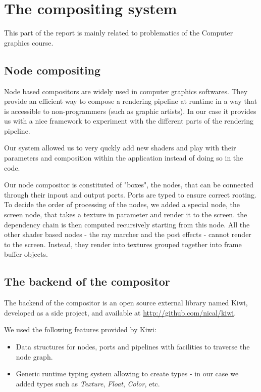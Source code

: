 \chapter{The compositing system\label{chap:compositor}}

This part of the report is mainly related to problematics of the Computer graphics course.

\section{Node compositing}

Node based compositors are widely used in computer graphics softwares. They provide
an efficient way to compose a rendering pipeline at runtime in a way that is accessible
to non-programmers (such as graphic artists). In our case it provides us with a
nice framework to experiment with the different parts of the rendering pipeline.

Our system allowed us to very quckly add new shaders and play with their parameters
and composition within the application instead of doing so in the code. 

Our node compositor is constituted of "boxes", the nodes, that can be connected
through their inpout and output ports. Ports are typed to ensure correct rooting.
To decide the order of processing of the nodes, we added a special node,
the screen node, that takes a texture in parameter and render it to the screen.
the dependency chain is then computed recursively starting from this node. All
the other shader based nodes - the ray marcher and the post effects - cannot render
to the screen. Instead, they render into textures grouped together into frame
buffer objects.

\section{The backend of the compositor}

The backend of the compositor is an open source external library named Kiwi, developed as a side
project, and available at \url{http://github.com/nical/kiwi}.

We used the following features provided by Kiwi:
\begin{itemize}
    \item Data structures for nodes, ports and pipelines with facilities to traverse the node graph.
    \item Generic runtime typing system allowing to create types - in our case we added
    types such as \textit{Texture}, \textit{Float}, \textit{Color}, etc.
\end{itemize}

